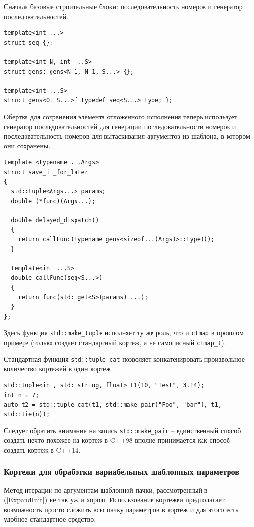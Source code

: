 \documentclass[a4paper,12pt,oneside]{article}
\begin{document}
Сначала базовые строительные блоки: последовательность номеров и генератор последовательностей.

\begin{lstlisting}
template<int ...> 
struct seq {};

template<int N, int ...S> 
struct gens: gens<N-1, N-1, S...> {};

template<int ...S> 
struct gens<0, S...>{ typedef seq<S...> type; };
\end{lstlisting}

Обертка для сохранения элемента отложенного исполнения теперь использует генератор последовательностей для генерации последовательности номеров и последовательность номеров для вытаскивания аргументов из шаблона, в котором они сохранены.

\begin{lstlisting}
template <typename ...Args>
struct save_it_for_later
{
  std::tuple<Args...> params;
  double (*func)(Args...);

  double delayed_dispatch()
  {
    return callFunc(typename gens<sizeof...(Args)>::type());
  }

  template<int ...S>
  double callFunc(seq<S...>)
  {
    return func(std::get<S>(params) ...);
  }
};
\end{lstlisting}

Здесь функция \lstinline!std::make_tuple! исполняет ту же роль, что и \lstinline!ctmap! в прошлом примере (только создает стандартный кортеж, а не самописный \lstinline!ctmap_t!).

Стандартная функция \lstinline!std::tuple_cat! позволяет конкатенировать произвольное количество кортежей в один кортеж

\begin{lstlisting}
std::tuple<int, std::string, float> t1(10, "Test", 3.14);
int n = 7;
auto t2 = std::tuple_cat(t1, std::make_pair("Foo", "bar"), t1, std::tie(n));
\end{lstlisting}

Следует обратить внимание на запись \lstinline!std::make_pair! -- единственный способ создать нечто похожее на кортеж в C++98 вполне принимается как способ создать кортеж в C++14.

\subsubsection{Кортежи для обработки вариабельных шаблонных параметров}\label{ExpandTuple}

Метод итерации по аргументам шаблонной пачки, рассмотренный в (\ref{ExpandInit}) не так уж и хорош. Использование кортежей предполагает возможность просто сложить всю пачку параметров в кортеж и для этого есть удобное стандартное средство.
\end{document}
